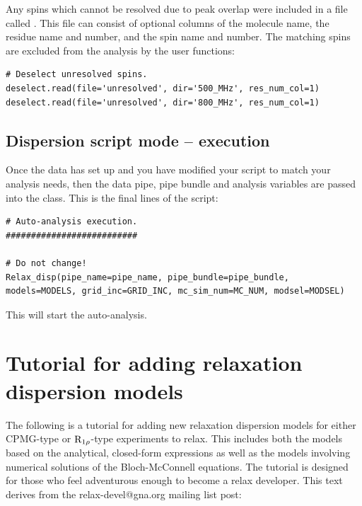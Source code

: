 Any spins which cannot be resolved due to peak overlap were included in a file called .  This file can consist of optional columns of the molecule name, the residue name and number, and the spin name and number.  The matching spins are excluded from the analysis by the user functions:

\begin{lstlisting}[firstnumber=113]
# Deselect unresolved spins.
deselect.read(file='unresolved', dir='500_MHz', res_num_col=1)
deselect.read(file='unresolved', dir='800_MHz', res_num_col=1)
\end{lstlisting}


\subsection{Dispersion script mode -- execution}

Once the data has set up and you have modified your script to match your analysis needs, then the data pipe, pipe bundle and analysis variables are passed into the  class.  This is the final lines of the script:

\begin{lstlisting}[firstnumber=119]
# Auto-analysis execution.
##########################

# Do not change!
Relax_disp(pipe_name=pipe_name, pipe_bundle=pipe_bundle, models=MODELS, grid_inc=GRID_INC, mc_sim_num=MC_NUM, modsel=MODSEL)
\end{lstlisting}

This will start the auto-analysis.




\section{Tutorial for adding relaxation dispersion models}
\label{sect: dispersion: model tutorial}

The following is a tutorial for adding new relaxation dispersion models for either CPMG-type or $\mathrm{R}_{1\rho}$-type experiments to relax.  This includes both the models based on the analytical, closed-form expressions as well as the models involving numerical solutions of the Bloch-McConnell equations.  The tutorial is designed for those who feel adventurous enough to become a relax developer.  This text derives from the relax-devel@gna.org mailing list post:

